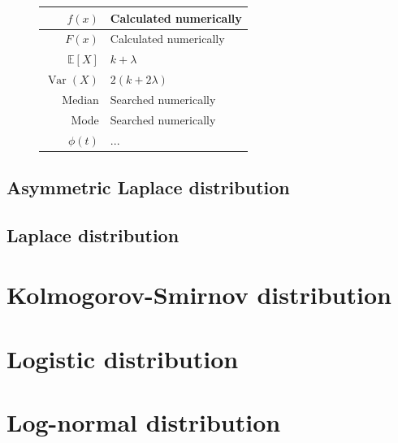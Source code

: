 \documentclass[a4paper,11pt]{article}
\theoremstyle{plain}
\theoremstyle{definition}
\newcommand{\ME}{\mathbb{E}}
\newcommand{\Var}{\operatorname{Var}}
\begin{document}
\begin{figure}[!htb]
\begin{minipage}{0.4\textwidth}
\begin{tabular}{| r | l |}
				\hline
				$f(x)$ & Calculated numerically \\
				\hline
				$F(x)$ & Calculated numerically \\
				\hline
				$\ME[X]$ & $ k + \lambda$ \\
				\hline
				$\Var(X)$ & $2(k+2\lambda)$ \\
				\hline
				Median & Searched numerically \\
				\hline
				Mode & Searched numerically \\
				\hline
				$\phi(t)$ & $ ...$ \\
				\hline
			\end{tabular}
		\end{minipage}
	\end{figure}
	
	\subsection{Asymmetric Laplace distribution}

	\subsection{Laplace distribution}
	
	\pagebreak
	\section{Kolmogorov-Smirnov distribution}
	\pagebreak
	\section{Logistic distribution}
	\pagebreak
	\section{Log-normal distribution}
	\pagebreak
	
\end{document}
